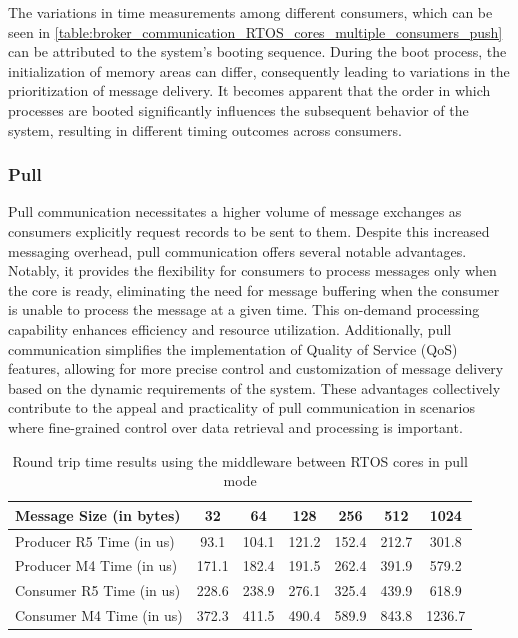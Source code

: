 The variations in time measurements among different consumers, which can be
seen in \ref{table:broker_communication_RTOS_cores_multiple_consumers_push}
can be attributed to the system's booting sequence.
During the boot process, the initialization of memory areas can differ,
consequently leading to variations in the prioritization of message delivery.
It becomes apparent that the order in which processes are booted significantly
influences the subsequent behavior of the system, resulting in different timing
outcomes across consumers.

\subsubsection{Pull}

Pull communication necessitates a higher volume of message exchanges as
consumers explicitly request records to be sent to them.
Despite this increased messaging overhead, pull communication offers several
notable advantages. Notably, it provides the flexibility for consumers to
process messages only when the core is ready, eliminating the need for message
buffering when the consumer is unable to process the message at a given time.
This on-demand processing capability enhances efficiency and resource
utilization. Additionally, pull communication simplifies the implementation
of Quality of Service (QoS) features, allowing for more precise control and
customization of message delivery based on the dynamic requirements of the
system. These advantages collectively contribute to the appeal and practicality
of pull communication in scenarios where fine-grained control over data
retrieval and processing is important. 

\begin{table}[H]
\centering
\caption{Round trip time results using the middleware between RTOS cores in
         pull mode}
\label{table:broker_communication_RTOS_cores}
\begin{tabular}{lcccccc}
\toprule
Message Size (in bytes) & 32 & 64 & 128 & 256 & 512 & 1024 \\
\midrule
Producer R5 Time (in us) & 93.1 & 104.1 & 121.2 & 152.4 & 212.7 & 301.8 \\
Producer M4 Time (in us) & 171.1 & 182.4 & 191.5 & 262.4 & 391.9 & 579.2 \\
Consumer R5 Time (in us) & 228.6 & 238.9 & 276.1 & 325.4 & 439.9 & 618.9 \\
Consumer M4 Time (in us) & 372.3 & 411.5 & 490.4 & 589.9 & 843.8 & 1236.7 \\
\bottomrule
\end{tabular}
\end{table}

